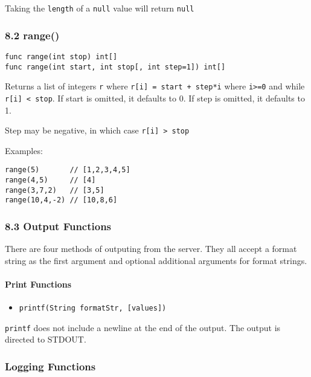 Taking the \texttt{length} of a \texttt{null} value will return
\texttt{null}

\subsubsection*{8.2 range()}\label{range}

\begin{verbatim}
func range(int stop) int[]
func range(int start, int stop[, int step=1]) int[]
\end{verbatim}

Returns a list of integers \texttt{r} where
\texttt{r{[}i{]} = start + step*i} where \texttt{i\textgreater{}=0} and
while \texttt{r{[}i{]} \textless{} stop}. If start is omitted, it
defaults to 0. If step is omitted, it defaults to 1.

Step may be negative, in which case
\texttt{r{[}i{]} \textgreater{} stop}

Examples:

\begin{verbatim}
range(5)       // [1,2,3,4,5]
range(4,5)     // [4]
range(3,7,2)   // [3,5]
range(10,4,-2) // [10,8,6]
\end{verbatim}

\subsubsection*{8.3 Output Functions}\label{output-functions}

There are four methods of outputing from the server. They all accept a
format string as the first argument and optional additional arguments
for format strings.

\paragraph{Print Functions}\label{print-functions}

\begin{itemize}
\itemsep1pt\parskip0pt
\item
  \texttt{printf(String formatStr, {[}values{]})}
\end{itemize}

\texttt{printf} does not include a newline at the end of the output. The
output is directed to STDOUT.

\subsubsection*{Logging Functions}\label{logging-functions}

